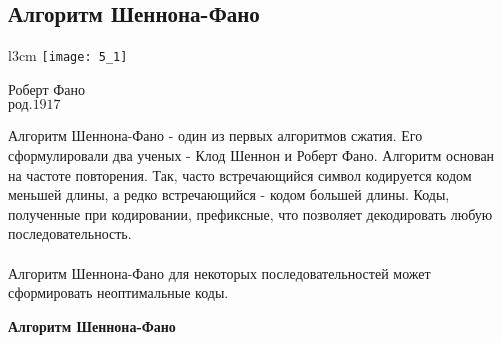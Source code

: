 \subsection{Алгоритм Шеннона-Фано}
\begin{wrapfigure}[13]{l}{3cm}
\texttt{[image: 5\_1]}
\begin{center}
\footnotesize{Роберт Фано}
\\\footnotesize{$\mbox{род.} 1917$}
\end{center}
\end{wrapfigure}
Алгоритм Шеннона-Фано - один из первых алгоритмов сжатия. Его сформулировали два ученых - Клод Шеннон и Роберт Фано. Алгоритм основан на частоте повторения. Так, часто встречающийся символ кодируется кодом меньшей длины, а редко встречающийся - кодом большей длины.
Коды, полученные при кодировании, префиксные, что позволяет декодировать любую последовательность.
\\
\\Алгоритм Шеннона-Фано для некоторых последовательностей может сформировать неоптимальные коды.
\\
\begin{center}
\textbf{Алгоритм Шеннона-Фано}
\end{center}

